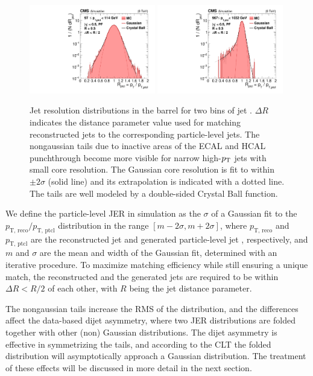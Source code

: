 \documentclass[11pt,twoside,a4paper,cmspaper,final,collab]{cms-tdr}
\begin{document}
\begin{figure}[htbp!]
\centering
\includegraphics[width=0.49\textwidth]{Figure_035-a.pdf}
\includegraphics[width=0.49\textwidth]{Figure_035-b.pdf}
\caption{\label{fig:jertails}
Jet \pt resolution distributions in the barrel for two bins of jet \pt. $\Delta R$ indicates the distance parameter value used for matching reconstructed jets to the corresponding particle-level jets. The nongaussian tails due to inactive areas of the ECAL and HCAL punchthrough become more visible for narrow high-$p_{\mathrm{T}}$ jets with small core resolution. The Gaussian core resolution is fit to within ${\pm}2\sigma$ (solid line) and its extrapolation is indicated with a dotted line.
The tails are well modeled by a double-sided Crystal Ball function.
}
\end{figure}

We define the particle-level JER in simulation as the $\sigma$ of a Gaussian fit to the $p_\text{T, reco}/p_\text{T, ptcl}$ distribution in the range $[m-2\sigma,m+2\sigma]$, where $p_\text{T, reco}$ and $p_\text{T, ptcl}$ are the reconstructed jet \pt and generated particle-level jet \pt, respectively, and $m$ and $\sigma$ are the mean and width of the Gaussian fit, determined with an iterative procedure. To maximize matching efficiency while still ensuring a unique match, the reconstructed and the generated jets are required to be within $\Delta R<R/2$ of each other, with $R$ being the jet distance parameter.

The nongaussian tails increase the RMS of the distribution,
and the differences affect the data-based dijet asymmetry, where two JER distributions are folded together with other (non) Gaussian distributions. The dijet asymmetry is effective in symmetrizing the tails, and according to the CLT the folded distribution will asymptotically approach a Gaussian distribution.
The treatment of these effects will be discussed in more detail in the next section.
\end{document}
